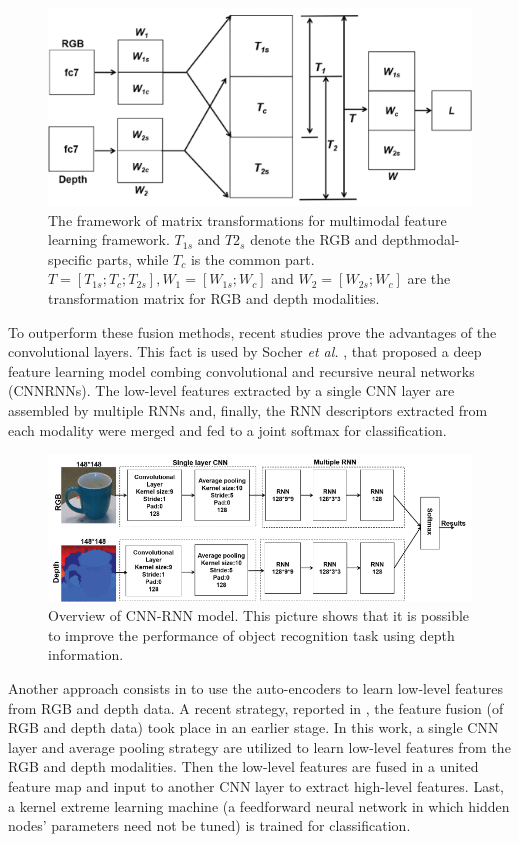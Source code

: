 \begin{figure}[h!]
	\centering
	\includegraphics[width=0.6\linewidth]{images/fision_transofmration_matrix.png}
	\caption{The framework of matrix transformations for multimodal feature learning framework. $T_{1s}$ and $T2_s$ denote the RGB and depthmodal-specific parts, while $T_c$ is the common part. $T = [T_{1s}
		; T_c ; T_{2s}
		],
		W_1 = [W_{1s}
		; W_c ]$ and $W_2 = [W_{2s}		; W_c ]$ are the transformation matrix for
		RGB and depth modalities.  }
\end{figure} 

\newpage

To outperform these fusion methods, recent studies prove the advantages of the convolutional layers. This fact is used by Socher \textit{et al.} \cite{47876543}, that proposed a deep feature learning model
combing convolutional and recursive neural networks (CNNRNNs). The low-level features extracted by a single CNN layer are assembled by multiple RNNs and, finally, the RNN descriptors extracted from each modality were merged and fed to a joint softmax for classification.

\begin{figure}[h!]
	\centering
	\includegraphics[width=0.6\linewidth]{images/CNNRNN.png}
	\caption{Overview of CNN-RNN model. This picture shows that it is possible to improve the performance of object recognition task using depth information.}
\end{figure} 


Another approach consists in to use the auto-encoders to learn low-level features from RGB and depth data. A recent strategy, reported in \cite{2342567}, the feature fusion (of RGB and depth data) took place in an earlier stage. In this work, a single CNN layer and average pooling strategy are utilized to learn low-level features from the RGB and depth modalities. Then the low-level features are fused in a united feature map and input to another CNN layer to extract high-level features. Last,
a kernel extreme learning machine (a feedforward neural network in which hidden nodes' parameters need not be tuned) is trained for classification. 

